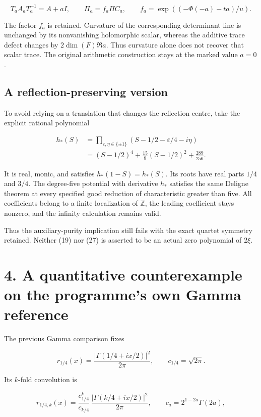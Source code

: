 \documentclass[
  11pt,
]{article}
\begin{document}
\[
T_aA_aT_a^{-1}=A+aI,\qquad
\Pi_a=f_a\Pi C_a,\qquad
f_a=\exp((-\Phi(-a)-ta)/u).
\tag{26}
\]

The factor \(f_a\) is retained. Curvature of the corresponding
determinant line is unchanged by its nonvanishing holomorphic scalar,
whereas the additive trace defect changes by \(2\dim(F)\Re a\). Thus
curvature alone does not recover that scalar trace. The original
arithmetic construction stays at the marked value \(a=0\).

\subsection{A reflection-preserving
version}\label{a-reflection-preserving-version}

To avoid relying on a translation that changes the reflection centre,
take the explicit rational polynomial

\[
\begin{aligned}
h_*(S)&=\prod_{\varepsilon,\eta\in\{\pm1\}}
(S-1/2-\varepsilon/4-i\eta)\\
&=(S-1/2)^4+\frac{15}{8}(S-1/2)^2+\frac{289}{256}.
\end{aligned}
\tag{27}
\]

It is real, monic, and satisfies \(h_*(1-S)=h_*(S)\). Its roots have
real parts \(1/4\) and \(3/4\). The degree-five potential with
derivative \(h_*\) satisfies the same Deligne theorem at every specified
good reduction of characteristic greater than five. All coefficients
belong to a finite localization of \(\mathbb Z\), the leading
coefficient stays nonzero, and the infinity calculation remains valid.

Thus the auxiliary-purity implication still fails with the exact quartet
symmetry retained. Neither (19) nor (27) is asserted to be an actual
zero polynomial of \(2\xi\).

\section{4. A quantitative counterexample on the programme's own Gamma
reference}\label{a-quantitative-counterexample-on-the-programmes-own-gamma-reference}

The previous Gamma comparison fixes

\[
r_{1/4}(x)=\frac{|\Gamma(1/4+ix/2)|^2}{2\pi},
\qquad c_{1/4}=\sqrt{2\pi}.
\tag{28}
\]

Its \(k\)-fold convolution is

\[
r_{1/4,k}(x)=\frac{c_{1/4}^k}{c_{k/4}}\,
\frac{|\Gamma(k/4+ix/2)|^2}{2\pi},
\qquad c_a=2^{1-2a}\Gamma(2a),
\tag{29}
\]
\end{document}
